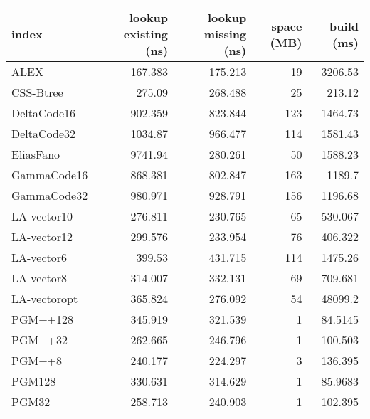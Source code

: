 \begin{tabular}{lrrrr}
\hline
 index             &   lookup existing (ns) &   lookup missing (ns) &   space (MB) &     build (ms) \\
\hline
 ALEX              &               167.383  &              175.213  &           19 &  3206.53       \\
 CSS-Btree         &               275.09   &              268.488  &           25 &   213.12       \\
 DeltaCode16       &               902.359  &              823.844  &          123 &  1464.73       \\
 DeltaCode32       &              1034.87   &              966.477  &          114 &  1581.43       \\
 EliasFano         &              9741.94   &              280.261  &           50 &  1588.23       \\
 GammaCode16       &               868.381  &              802.847  &          163 &  1189.7        \\
 GammaCode32       &               980.971  &              928.791  &          156 &  1196.68       \\
 LA-vector10       &               276.811  &              230.765  &           65 &   530.067      \\
 LA-vector12       &               299.576  &              233.954  &           76 &   406.322      \\
 LA-vector6        &               399.53   &              431.715  &          114 &  1475.26       \\
 LA-vector8        &               314.007  &              332.131  &           69 &   709.681      \\
 LA-vectoropt      &               365.824  &              276.092  &           54 & 48099.2        \\
 PGM++128          &               345.919  &              321.539  &            1 &    84.5145     \\
 PGM++32           &               262.665  &              246.796  &            1 &   100.503      \\
 PGM++8            &               240.177  &              224.297  &            3 &   136.395      \\
 PGM128            &               330.631  &              314.629  &            1 &    85.9683     \\
 PGM32             &               258.713  &              240.903  &            1 &   102.395      \\

\end{tabular}
